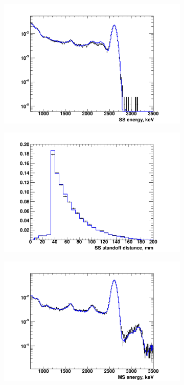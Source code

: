\documentclass[herrin-thesis.tex]{subfiles}
\begin{document}
\begin{figure}[htp]
\centering
	\begin{subfigure}[c]{0.48\textwidth}
	\centering
	\includegraphics[width=\textwidth]{./plots/analysis_shape_agreement_E_ThS5SSlog.pdf}
	\end{subfigure}\hfill%
	\begin{subfigure}[c]{0.48\textwidth}
	\centering
	\includegraphics[width=\textwidth]{./plots/analysis_shape_agreement_sd_ThS5SSlin.pdf}
	\end{subfigure}
	\begin{subfigure}[c]{0.48\textwidth}
	\centering
	\includegraphics[width=\textwidth]{./plots/analysis_shape_agreement_E_ThS5MSlog.pdf}

\end{subfigure}
\end{figure}
\end{document}
